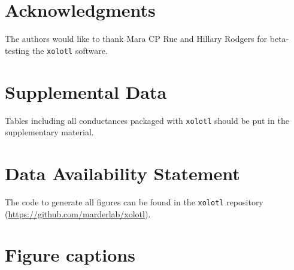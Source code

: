 \documentclass{frontiersSCNS} %
\begin{document}
\section*{Acknowledgments}
The authors would like to thank Mara CP Rue and Hillary Rodgers for beta-testing the \texttt{xolotl} software.

\section*{Supplemental Data}
Tables including all conductances packaged with \texttt{xolotl} should be put in the supplementary material.

\section*{Data Availability Statement}

The code to generate all figures can be found in the \texttt{xolotl} repository (\url{https://github.com/marderlab/xolotl}).

%
%
%
%
%
%

\printbibliography

%
%
%
%
%
%


\section*{Figure captions}

\FloatBarrier
\end{document}
